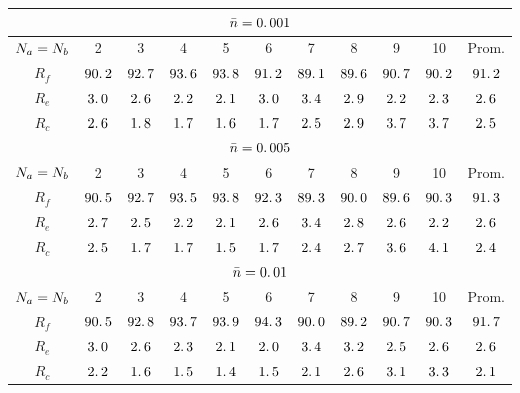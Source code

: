 \begin{table}[h]
\centering
\begin{tabular}{|c|c|c|c|c|c|c|c|c|c|c|}
\hline \multicolumn{11}{|c|}{$\bar{n}=0\ldotp 001$}\\
\hline $N_a=N_b$ & 2&3&4&5&6&7&8&9&10&Prom.\\
\hline $R_f$ & $ 90\ldotp 2$ & $ 92\ldotp 7$ & $ 93\ldotp 6$ & $ 93\ldotp 8$ & $ 91\ldotp 2$ & $ 89\ldotp 1$ & $ 89\ldotp 6$ & $ 90\ldotp 7$ & $ 90\ldotp 2$ & $ 91\ldotp 2$\\
\hline $R_e$ & $  3\ldotp 0$ & $  2\ldotp 6$ & $  2\ldotp 2$ & $  2\ldotp 1$ & $  3\ldotp 0$ & $  3\ldotp 4$ & $  2\ldotp 9$ & $  2\ldotp 2$ & $  2\ldotp 3$ & $  2\ldotp 6$\\
\hline $R_c$ & $  2\ldotp 6$ & $  1\ldotp 8$ & $  1\ldotp 7$ & $  1\ldotp 6$ & $  1\ldotp 7$ & $  2\ldotp 5$ & $  2\ldotp 9$ & $  3\ldotp 7$ & $  3\ldotp 7$ & $  2\ldotp 5$\\
\hline
\hline \multicolumn{11}{|c|}{$\bar{n}=0\ldotp 005$}\\
\hline $N_a=N_b$ & 2&3&4&5&6&7&8&9&10&Prom.\\
\hline $R_f$ & $ 90\ldotp 5$ & $ 92\ldotp 7$ & $ 93\ldotp 5$ & $ 93\ldotp 8$ & $ 92\ldotp 3$ & $ 89\ldotp 3$ & $ 90\ldotp 0$ & $ 89\ldotp 6$ & $ 90\ldotp 3$ & $ 91\ldotp 3$\\
\hline $R_e$ & $  2\ldotp 7$ & $  2\ldotp 5$ & $  2\ldotp 2$ & $  2\ldotp 1$ & $  2\ldotp 6$ & $  3\ldotp 4$ & $  2\ldotp 8$ & $  2\ldotp 6$ & $  2\ldotp 2$ & $  2\ldotp 6$\\
\hline $R_c$ & $  2\ldotp 5$ & $  1\ldotp 7$ & $  1\ldotp 7$ & $  1\ldotp 5$ & $  1\ldotp 7$ & $  2\ldotp 4$ & $  2\ldotp 7$ & $  3\ldotp 6$ & $  4\ldotp 1$ & $  2\ldotp 4$\\
\hline
\hline \multicolumn{11}{|c|}{$\bar{n}=0\ldotp 01$}\\
\hline $N_a=N_b$ & 2&3&4&5&6&7&8&9&10&Prom.\\
\hline $R_f$ & $ 90\ldotp 5$ & $ 92\ldotp 8$ & $ 93\ldotp 7$ & $ 93\ldotp 9$ & $ 94\ldotp 3$ & $ 90\ldotp 0$ & $ 89\ldotp 2$ & $ 90\ldotp 7$ & $ 90\ldotp 3$ & $ 91\ldotp 7$\\
\hline $R_e$ & $  3\ldotp 0$ & $  2\ldotp 6$ & $  2\ldotp 3$ & $  2\ldotp 1$ & $  2\ldotp 0$ & $  3\ldotp 4$ & $  3\ldotp 2$ & $  2\ldotp 5$ & $  2\ldotp 6$ & $  2\ldotp 6$\\
\hline $R_c$ & $  2\ldotp 2$ & $  1\ldotp 6$ & $  1\ldotp 5$ & $  1\ldotp 4$ & $  1\ldotp 5$ & $  2\ldotp 1$ & $  2\ldotp 6$ & $  3\ldotp 1$ & $  3\ldotp 3$ & $  2\ldotp 1$\\

\end{tabular}
\end{table}
